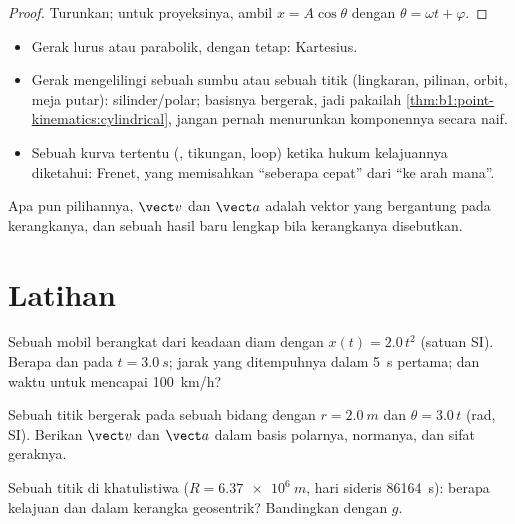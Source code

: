 \begin{proof}
Turunkan; untuk proyeksinya, ambil $x = A\cos\theta$ dengan $\theta =
\omega t + \varphi$.
\end{proof}

\begin{method}\label{met:b1:point-kinematics:choose}
\begin{itemize}
  \item Gerak lurus atau parabolik, dengan  tetap: Kartesius.
  \item Gerak mengelilingi sebuah sumbu atau sebuah titik (lingkaran,
        pilinan, orbit, meja putar): silinder/polar; basisnya bergerak,
        jadi pakailah \cref{thm:b1:point-kinematics:cylindrical}, jangan
        pernah menurunkan komponennya secara naif.
  \item Sebuah kurva tertentu (, tikungan, loop) ketika hukum
        kelajuannya diketahui: Frenet, yang memisahkan ``seberapa
        cepat'' dari ``ke arah mana''.
\end{itemize}
Apa pun pilihannya, $\vect v$ dan $\vect a$ adalah vektor yang
bergantung pada kerangkanya, dan sebuah hasil baru lengkap bila
kerangkanya disebutkan.
\end{method}

\section{Latihan}

\begin{exercise}[$\star$]\label{exo:b1:point-kinematics:1}
Sebuah mobil berangkat dari keadaan diam dengan $x(t) = 2.0\,t^2$
(satuan SI). Berapa  dan  pada $t = \qty{3.0}{s}$;
jarak yang ditempuhnya dalam \qty{5}{s} pertama; dan waktu untuk
mencapai \qty{100}{km/h}?
\end{exercise}

\begin{exercise}[$\star$]\label{exo:b1:point-kinematics:2}
Sebuah titik bergerak pada sebuah bidang dengan $r = \qty{2.0}{m}$ dan
$\theta = 3.0\,t$ (rad, SI). Berikan $\vect v$ dan $\vect a$ dalam basis
polarnya, normanya, dan sifat geraknya.
\end{exercise}

\begin{exercise}[$\star$]\label{exo:b1:point-kinematics:3}
Sebuah titik di khatulistiwa ($R = \qty{6.37e6}{m}$, hari sideris
\qty{86164}{s}): berapa kelajuan dan  dalam kerangka
geosentrik? Bandingkan  dengan $g$.
\end{exercise}

